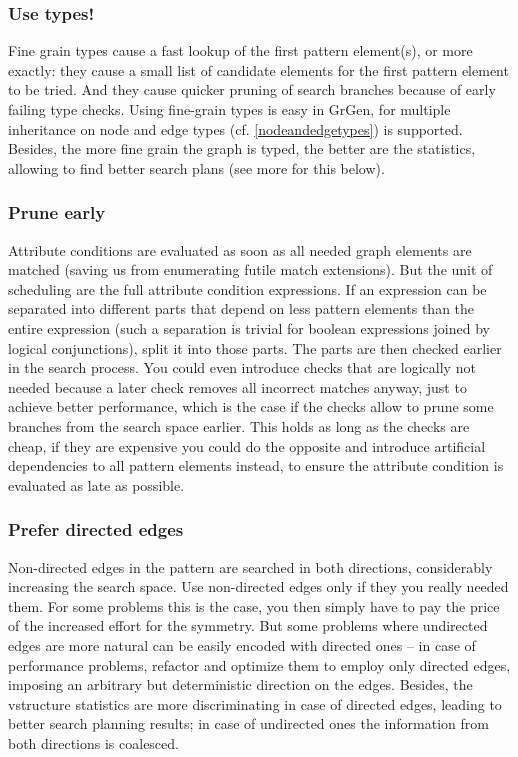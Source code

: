 \subsubsection*{Use types!}
Fine grain types cause a fast lookup of the first pattern element(s), or more exactly: they cause a small list of candidate elements for the first pattern element to be tried.
And they cause quicker pruning of search branches because of early failing type checks.
Using fine-grain types is easy in GrGen, for multiple inheritance on node and edge types (cf. \ref{nodeandedgetypes}) is supported.
Besides, the more fine grain the graph is typed, the better are the statistics, allowing \GrG{ } to find better search plans (see more for this below).

\subsubsection*{Prune early}
Attribute conditions are evaluated as soon as all needed graph elements are matched (saving us from enumerating futile match extensions).
But the unit of scheduling are the full attribute condition expressions. 
If an expression can be separated into different parts that depend on less pattern elements than the entire expression (such a separation is trivial for boolean expressions joined by logical conjunctions), split it into those parts.
The parts are then checked earlier in the search process.
You could even introduce checks that are logically not needed because a later check removes all incorrect matches anyway, just to achieve better performance, which is the case if the checks allow to prune some branches from the search space earlier.
This holds as long as the checks are cheap, if they are expensive you could do the opposite and introduce artificial dependencies to all pattern elements instead, to ensure the attribute condition is evaluated as late as possible.

\pagebreak

\subsubsection*{Prefer directed edges}
Non-directed edges in the pattern are searched in both directions, considerably increasing the search space.
Use non-directed edges only if they you really needed them.
For some problems this is the case, you then simply have to pay the price of the increased effort for the symmetry.
But some problems where undirected edges are more natural can be easily encoded with directed ones -- in case of performance problems, refactor and optimize them to employ only directed edges, imposing an arbitrary but deterministic direction on the edges.
Besides, the vstructure statistics are more discriminating in case of directed edges, leading to better search planning results; in case of undirected ones the information from both directions is coalesced.

